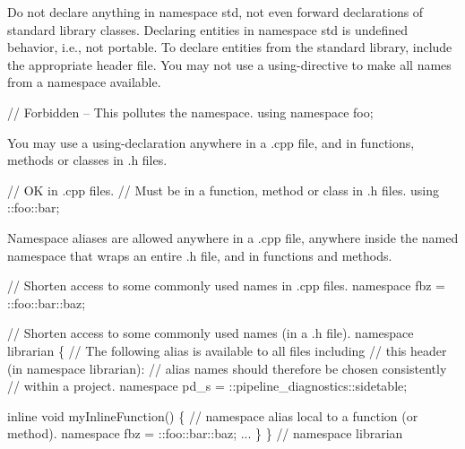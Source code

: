 \begin{DoxyItemize}
\item Do not declare anything in namespace std, not even forward declarations of standard library classes. Declaring entities in namespace std is undefined behavior, i.\+e., not portable. To declare entities from the standard library, include the appropriate header file. You may not use a using-\/directive to make all names from a namespace available.
\end{DoxyItemize}


\begin{DoxyCode}
\textcolor{comment}{// Forbidden -- This pollutes the namespace.}
\textcolor{keyword}{using namespace }foo;
\end{DoxyCode}



\begin{DoxyItemize}
\item You may use a using-\/declaration anywhere in a .cpp file, and in functions, methods or classes in .h files.
\end{DoxyItemize}


\begin{DoxyCode}
\textcolor{comment}{// OK in .cpp files.}
\textcolor{comment}{// Must be in a function, method or class in .h files.}
using ::foo::bar;
\end{DoxyCode}



\begin{DoxyItemize}
\item Namespace aliases are allowed anywhere in a .cpp file, anywhere inside the named namespace that wraps an entire .h file, and in functions and methods.
\end{DoxyItemize}


\begin{DoxyCode}
\textcolor{comment}{// Shorten access to some commonly used names in .cpp files.}
\textcolor{keyword}{namespace }fbz = ::foo::bar::baz;

\textcolor{comment}{// Shorten access to some commonly used names (in a .h file).}
\textcolor{keyword}{namespace }librarian \{
\textcolor{comment}{// The following alias is available to all files including}
\textcolor{comment}{// this header (in namespace librarian):}
\textcolor{comment}{// alias names should therefore be chosen consistently}
\textcolor{comment}{// within a project.}
\textcolor{keyword}{namespace }pd\_s = ::pipeline\_diagnostics::sidetable;

\textcolor{keyword}{inline} \textcolor{keywordtype}{void} myInlineFunction() \{
\textcolor{comment}{// namespace alias local to a function (or method).}
\textcolor{keyword}{namespace }fbz = ::foo::bar::baz;
...
\}
\}  \textcolor{comment}{// namespace librarian}
\end{DoxyCode}


